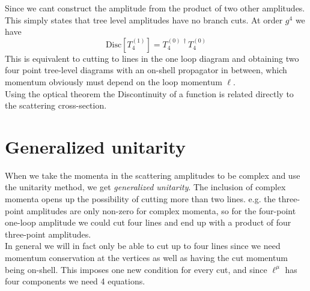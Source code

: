 \documentclass[a4paper,12pt]{article}
\begin{document}
Since we cant construct the amplitude from the product of two other amplitudes. This simply states that tree level amplitudes have no branch cuts. At order $g^4$ we have 
\begin{equation}
	\text{Disc}[T_4^{(1)}]=T_4^{(0)\,\dagger} T_4^{(0)}
\end{equation}
This is equivalent to cutting to lines in the one loop diagram and obtaining two four point tree-level diagrams with an on-shell propagator in between, which momentum obviously must depend on the loop momentum $\ell$.\\
Using the optical theorem the Discontinuity of a function is related directly to the scattering cross-section.
\section{Generalized unitarity}
When we take the momenta in the scattering amplitudes to be complex and use the unitarity method, we get \textit{generalized unitarity}. The inclusion of complex momenta opens up the possibility of cutting more than two lines. e.g. the three-point amplitudes are only non-zero for complex momenta, so for the four-point one-loop amplitude we could cut four lines and end up with a product of four three-point amplitudes.\\
In general we will in fact only be able to cut up to four lines since we need momentum conservation at the vertices as well as having the cut momentum being on-shell. This imposes one new condition for every cut, and since $\ell^\mu$ has four components we need 4 equations.
\end{document}

